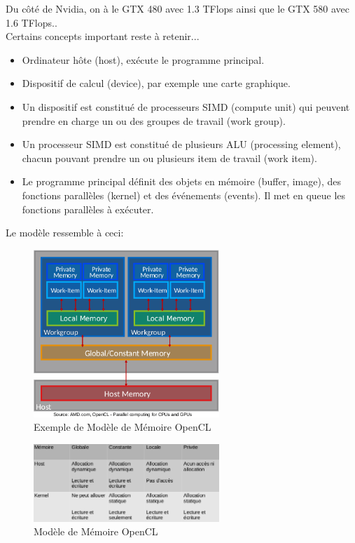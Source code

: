 \documentclass[oneside]{book}
\begin{document}
Du côté de Nvidia, on à le GTX 480 avec 1.3 TFlops ainsi que le GTX 580 avec 1.6 TFlops..\\

Certains concepts important reste à retenir... 
\begin{itemize}
\item Ordinateur hôte (host), exécute le programme principal.
\item Dispositif de calcul (device), par exemple une carte graphique.
\item Un dispositif est constitué de processeurs SIMD (compute unit) qui
peuvent prendre en charge un ou des groupes de travail (work group).
\item Un processeur SIMD est constitué de plusieurs ALU (processing
element), chacun pouvant prendre un ou plusieurs item de travail
(work item).
\item Le programme principal définit des objets en mémoire (buffer, image),
des fonctions parallèles (kernel) et des événements (events). Il met en
queue les fonctions parallèles à exécuter.
\end{itemize}

Le modèle ressemble à ceci:
\begin{figure}[!ht]
\centering
\includegraphics[width = 7cm]{opencl_memory.png}
\caption{Exemple de Modèle de Mémoire OpenCL}
\label{fig:OpenCL_Memory}
\end{figure}

\begin{figure}[!ht]
\centering
\includegraphics[width = 7cm]{opencl_table.png}
\caption{Modèle de Mémoire OpenCL}
\label{fig:OpenCL_Memory_Model}
\end{figure}
\end{document}
